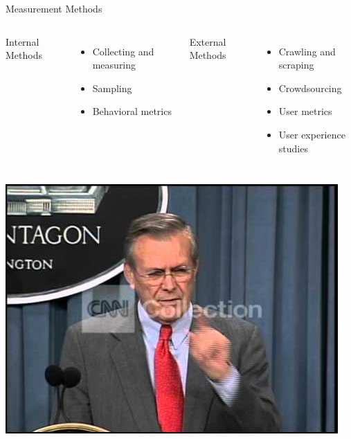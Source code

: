 \documentclass[nobackground,dvipsnames,table,aspectratio=169]{beamer}
\begin{document}
\begin{frame}{Measurement Methods}
    \begin{columns}[T]
            \Large{Internal Methods} \\
            \begin{itemize}
                \item Collecting and measuring \\
                \item Sampling \\
                \item Behavioral metrics \\
            \end{itemize}
            \Large{External Methods} \\
            \begin{itemize}
                \item Crawling and scraping \\
                \item Crowdsourcing \\
                \item User metrics \\
                \item User experience studies \\
            \end{itemize}
    \end{columns}
\end{frame}

\begin{frame}{} %
    \thispagestyle{empty}
    \href{https://www.youtube.com/watch?v=REWeBzGuzCc}{\includegraphics[width=\paperwidth]{unknown-unknowns}}
\end{frame}
\end{document}

